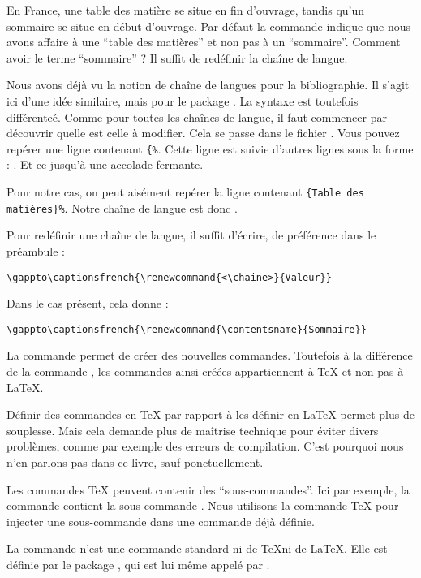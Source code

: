 En France, une table des matière se situe en fin d'ouvrage, tandis qu'un sommaire se situe en début d'ouvrage. Par défaut la commande  indique que nous avons affaire à une  \enquote{table des matières} et non pas à un \enquote{sommaire}. Comment avoir le terme  \enquote{sommaire} ? Il suffit de redéfinir la chaîne de langue. 

Nous avons déjà vu la notion de chaîne de langues pour la bibliographie. Il s'agit ici  d'une idée similaire, mais pour le package . La syntaxe est toutefois différenteé. Comme pour  toutes les chaînes de langue, il faut commencer par découvrir quelle est celle à modifier. Cela se passe dans le fichier . Vous pouvez repérer une ligne contenant \verb|{%|. 
Cette ligne est suivie d'autres lignes sous la forme : . Et ce jusqu'à une accolade fermante.

Pour notre cas, on peut aisément repérer la ligne contenant \verb|{Table des matières}%|.
Notre chaîne de langue est donc .

Pour  redéfinir une chaîne de langue, il suffit d'écrire, de préférence dans le préambule :

\begin{verbatim}
\gappto\captionsfrench{\renewcommand{<\chaine>}{Valeur}}
\end{verbatim}

Dans le cas présent, cela donne :

\begin{verbatim}
\gappto\captionsfrench{\renewcommand{\contentsname}{Sommaire}}
\end{verbatim}



\begin{plusloins}
La commande  permet de créer des nouvelles commandes. Toutefois à la différence de la commande , les commandes ainsi créées appartiennent à \TeX{} et non pas à \LaTeX{}.

Définir des commandes en \TeX{} par rapport à les définir en \LaTeX{} permet plus de souplesse. Mais cela demande plus de maîtrise technique pour éviter divers problèmes, comme par exemple des erreurs de compilation. C'est pourquoi nous n'en parlons pas dans ce livre, sauf ponctuellement.

Les commandes \TeX{} peuvent contenir des \enquote{sous-commandes}. Ici par exemple, la commande  contient la sous-commande . Nous utilisons la commande \TeX{}  pour injecter une sous-commande dans une commande déjà définie.

La commande  n'est une commande standard ni de \TeX ni de \LaTeX. Elle est définie par le package , qui est lui même appelé par .
\end{plusloins}

